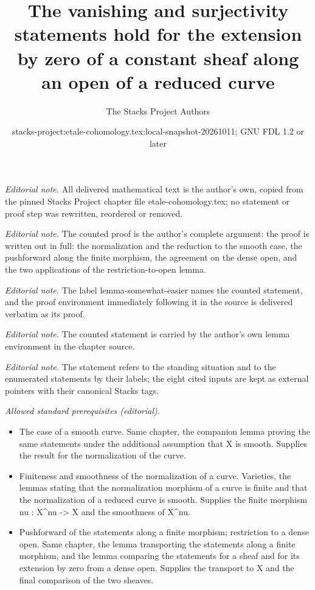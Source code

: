 \documentclass[10pt,a4paper]{amsart}
\title{The vanishing and surjectivity statements hold for the extension by zero of a constant sheaf along an open of a reduced curve}
\author{The Stacks Project Authors}
\date{stacks-project:etale-cohomology.tex:local-snapshot-20261011; GNU FDL 1.2 or later}
\theoremstyle{plain}
\theoremstyle{definition}
\theoremstyle{remark}
\numberwithin{equation}{subsection}
\begin{document}
\maketitle
\noindent\textit{Editorial note.} All delivered mathematical text is the author's own, copied from the pinned Stacks Project chapter file etale-cohomology.tex; no statement or proof step was rewritten, reordered or removed.\par\medskip
\noindent\textit{Editorial note.} The counted proof is the author's complete argument: the proof is written out in full: the normalization and the reduction to the smooth case, the pushforward along the finite morphism, the agreement on the dense open, and the two applications of the restriction-to-open lemma.\par\medskip
\noindent\textit{Editorial note.} The label lemma-somewhat-easier names the counted statement, and the proof environment immediately following it in the source is delivered verbatim as its proof.\par\medskip
\noindent\textit{Editorial note.} The counted statement is carried by the author's own lemma environment in the chapter source.\par\medskip
\noindent\textit{Editorial note.} The statement refers to the standing situation and to the enumerated statements by their labels; the eight cited inputs are kept as external pointers with their canonical Stacks tags.\par\medskip
\noindent\textit{Allowed standard prerequisites (editorial).}\begin{itemize}
\item The case of a smooth curve. Same chapter, the companion lemma proving the same statements under the additional assumption that X is smooth. Supplies the result for the normalization of the curve.
\item Finiteness and smoothness of the normalization of a curve. Varieties, the lemmas stating that the normalization morphism of a curve is finite and that the normalization of a reduced curve is smooth. Supplies the finite morphism nu : X\textasciicircum{}nu -> X and the smoothness of X\textasciicircum{}nu.
\item Pushforward of the statements along a finite morphism; restriction to a dense open. Same chapter, the lemma transporting the statements along a finite morphism, and the lemma comparing the statements for a sheaf and for its extension by zero from a dense open. Supplies the transport to X and the final comparison of the two sheaves.
\end{itemize}\medskip
\end{document}
